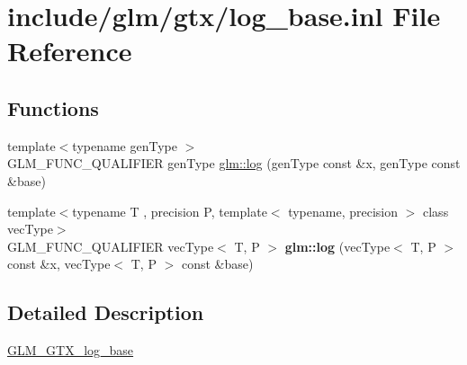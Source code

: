 \hypertarget{log__base_8inl}{}\section{include/glm/gtx/log\+\_\+base.inl File Reference}
\label{log__base_8inl}
\subsection*{Functions}
\begin{DoxyCompactItemize}
\item 
{\footnotesize template$<$typename gen\+Type $>$ }\\G\+L\+M\+\_\+\+F\+U\+N\+C\+\_\+\+Q\+U\+A\+L\+I\+F\+I\+ER gen\+Type \hyperlink{group__gtx__log__base_ga60a7b0a401da660869946b2b77c710c9}{glm\+::log} (gen\+Type const \&x, gen\+Type const \&base)
\item 
\mbox{\label{log__base_8inl_a34910ffc6f0455ba14d6a0c4c75b0607}} 
{\footnotesize template$<$typename T , precision P, template$<$ typename, precision $>$ class vec\+Type$>$ }\\G\+L\+M\+\_\+\+F\+U\+N\+C\+\_\+\+Q\+U\+A\+L\+I\+F\+I\+ER vec\+Type$<$ T, P $>$ {\bfseries glm\+::log} (vec\+Type$<$ T, P $>$ const \&x, vec\+Type$<$ T, P $>$ const \&base)
\end{DoxyCompactItemize}


\subsection{Detailed Description}
\hyperlink{group__gtx__log__base}{G\+L\+M\+\_\+\+G\+T\+X\+\_\+log\+\_\+base} 